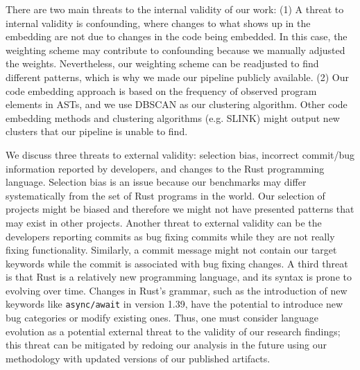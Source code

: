 There are two main threats to the internal validity of our work: (1) A threat to internal validity is confounding, where changes to what shows up in the embedding are not due to changes in the code being embedded. In this case, the weighting scheme may contribute to confounding because we manually adjusted the weights. Nevertheless, our weighting scheme can be readjusted to find different patterns, which is why we made our pipeline publicly available. (2) Our code embedding approach is based on the frequency of observed program elements in ASTs, and we use DBSCAN as our clustering algorithm. Other code embedding methods and clustering algorithms (e.g. SLINK) might output new clusters that our pipeline is unable to find.

We discuss three threats to external validity: selection bias, incorrect commit/bug information reported by developers, and changes to the Rust programming language. Selection bias is an issue because our benchmarks may differ systematically from the set of Rust programs in the world. Our selection of projects might be biased and therefore we might not have presented patterns that may exist in other projects. Another threat to external validity can be the developers reporting commits as bug fixing commits while they are not really fixing functionality. Similarly, a commit message might not contain our target keywords while the commit is associated with bug fixing changes. A third threat is that Rust is a relatively new programming language, and its syntax is prone to evolving over time. Changes in Rust's grammar, such as the introduction of new keywords like \verb+async/await+ in version 1.39, have the potential to introduce new bug categories or modify existing ones. Thus, one must consider language evolution as a potential external threat to the validity of our research findings; this threat can be mitigated by redoing our analysis in the future using our methodology with updated versions of our published artifacts.
